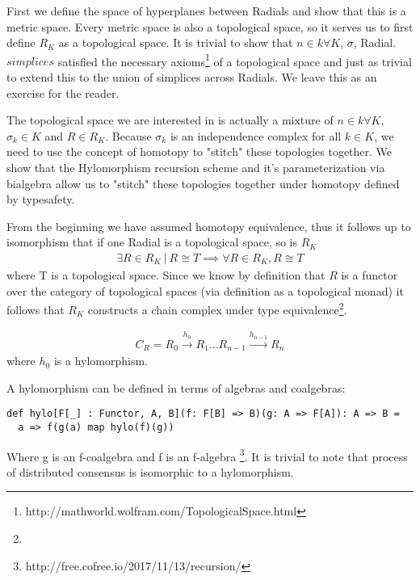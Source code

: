 \documentclass{article}
\begin{document}
First we define the space of hyperplanes between Radials and show that this is a metric space. Every metric space is also a topological space, so it serves us to first define $R_K$ as a topological space. It is trivial to show that $n \in k \forall K$, $\sigma$, Radial.$simplices$ satisfied the necessary axioms\footnote{http://mathworld.wolfram.com/TopologicalSpace.html} of a topological space and just as trivial to extend this to the union of simplices across Radials. We leave this as an exercise for the reader. 

The topological space we are interested in is actually a mixture of $n \in k \forall K$, $\sigma_k \in K$ and $R \in R_K$. Because $\sigma_k$ is an independence complex for all $k \in K$, we need to use the concept of homotopy to "stitch" these topologies together. We show that the Hylomorphism recursion scheme and it's parameterization via bialgebra allow us to "stitch" these topologies together under homotopy defined by typesafety.

From the beginning we have assumed homotopy equivalence, thus it follows up to isomorphism that if one Radial is a topological space, so is $R_K$
\begin{equation} \label{eq1}
\begin{split}
\exists R \in R_K \ | \ R \cong T \implies \forall R \in R_K,  R \cong T
\end{split}
\end{equation}
where T is a topological space. Since we know by definition that $R$ is a functor over the category of topological spaces (via definition as a topological monad) it follows that $R_K$ constructs a chain complex under type equivalence\footnote{}. 

\begin{equation} \label{eq1}
\begin{split}
C_R = R_{0}{\xrightarrow {h_{0}}}R_{1} \dots R_{n-1}{\xrightarrow {h_{n-1}}}R_{n}
\end{split}
\end{equation}
where $h_{0}$ is a hylomorphism.

A hylomorphism can be defined in terms of algebras and coalgebras:
\begin{lstlisting}
def hylo[F[_] : Functor, A, B](f: F[B] => B)(g: A => F[A]): A => B =
  a => f(g(a) map hylo(f)(g))
\end{lstlisting}
Where g is an f-coalgebra and f is an f-algebra \footnote{http://free.cofree.io/2017/11/13/recursion/}. It is trivial to note that process of distributed consensus is isomorphic to a hylomorphism. 
\end{document}
